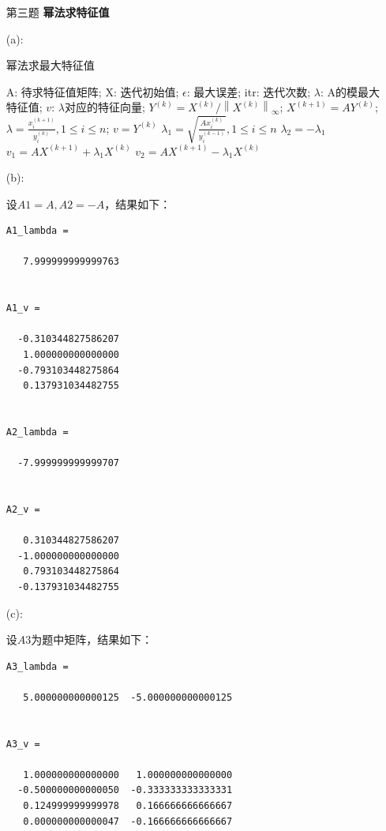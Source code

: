 \documentclass[12pt,a4paper,utf8]{ctexart}
\begin{document}
\begin{enumerate}
\newpage
\item[第三题]\textbf{幂法求特征值}  

(a):
\begin{algorithm}[htbp] 
   \caption{幂法求最大特征值}  
   \begin{algorithmic}[1] 
      \Require
      A: 待求特征值矩阵;  
      X: 迭代初始值;  
      $\epsilon$: 最大误差;
      itr: 迭代次数; 
    \Ensure  
      $\lambda$: A的模最大特征值;
      $v$: $\lambda$对应的特征向量;
       \State $Y^{(k)}=X^{(k)}/\left\lVert X^{(k)}\right\rVert _{\infty }$;  
       \State $X^{(k+1)}=AY^{(k)}$;  
     \EndFor  
       \State $\lambda =\frac{x_i^{(k+1)}}{y_i^{(k)}},1\leq i\leq n$;
       \State $v=Y^{(k)}$
       \State $\lambda_1=\sqrt{\frac{Ax_i^{(k)}}{y_i^{(k-1)}}},1\leq i\leq n$
       \State $\lambda_2=-\lambda_1$
       \State $v_1=AX^{(k+1)}+\lambda_1 X^{(k)}$
       \State $v_2=AX^{(k+1)}-\lambda_1 X^{(k)}$
     \EndIf
   \end{algorithmic}  
 \end{algorithm}  

(b):

设$A1=A,A2=-A$，结果如下：
\begin{lstlisting}[frame=single]
A1_lambda =

   7.999999999999763


A1_v =

  -0.310344827586207
   1.000000000000000
  -0.793103448275864
   0.137931034482755


A2_lambda =

  -7.999999999999707


A2_v =

   0.310344827586207
  -1.000000000000000
   0.793103448275864
  -0.137931034482755

\end{lstlisting}

(c):

设$A3$为题中矩阵，结果如下：
\begin{lstlisting}[frame=single]
A3_lambda =

   5.000000000000125  -5.000000000000125


A3_v =

   1.000000000000000   1.000000000000000
  -0.500000000000050  -0.333333333333331
   0.124999999999978   0.166666666666667
   0.000000000000047  -0.166666666666667
\end{lstlisting}


\end{enumerate}
\end{document}
